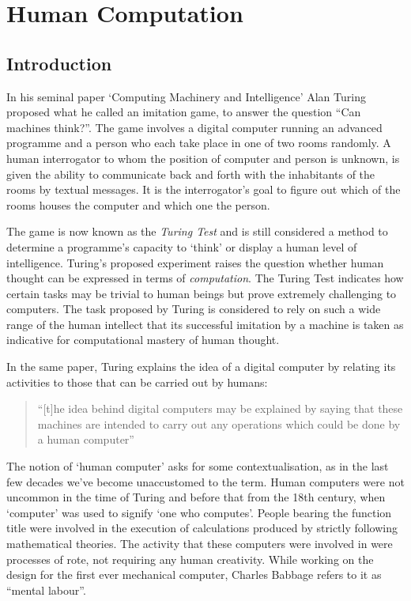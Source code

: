\chapter{Human Computation}
\label{ch:human_computation}

\section{Introduction} %
\label{sec:hc_introduction}



In his seminal paper `Computing Machinery and Intelligence' Alan Turing proposed what he called an imitation game, to answer the question ``Can machines think?''\cite{Turing:1950wi}. The game involves a digital computer running an advanced programme and a person who each take place in one of two rooms randomly. A human interrogator to whom the position of computer and person is unknown, is given the ability to communicate back and forth with the inhabitants of the rooms by textual messages. It is the interrogator's goal to figure out which of the rooms houses the computer and which one the person.

The game is now known as the \emph{Turing Test} and is still considered a method to determine a programme's capacity to `think' or display a human level of intelligence. Turing's proposed experiment raises the question whether human thought can be expressed in terms of \emph{computation}. The Turing Test indicates how certain tasks may be trivial to human beings but prove extremely challenging to computers. The task proposed by Turing is considered to rely on such a wide range  of the human intellect that its successful imitation by a machine is taken as indicative for computational mastery of human thought.

In the same paper, Turing explains the idea of a digital computer by relating its activities to those that can be carried out by humans:

\begin{quote}
  ``[t]he idea behind digital computers may be explained by saying that these machines are intended to carry out any operations which could be done by a human computer''\cite{Turing:1950wi}
\end{quote}

The notion of `human computer' asks for some contextualisation, as in the last few decades we've become unaccustomed to the term. Human computers were not uncommon in the time of Turing and before that from the 18th century, when `computer' was used to signify `one who computes'\cite{grier2007computers}. People bearing the function title were involved in the execution of calculations produced by strictly following mathematical theories. The activity that these computers were involved in were processes of rote, not requiring any human creativity. While working on the design for the first ever mechanical computer, Charles Babbage refers to it as ``mental labour''\cite[Ch.\ 20]{Babbage:1832vu}.

